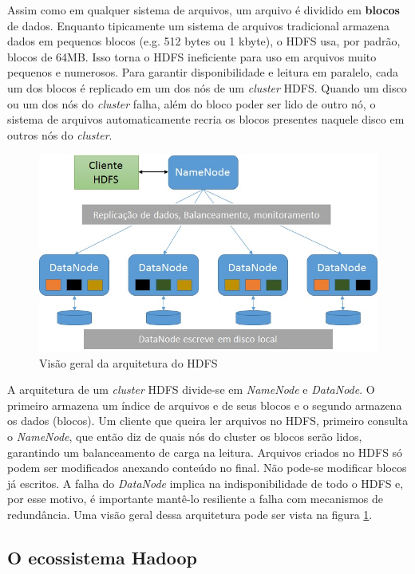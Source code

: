 Assim como em qualquer sistema de arquivos, um arquivo é dividido em \textbf{blocos} de dados. Enquanto 
tipicamente um sistema de arquivos tradicional armazena dados em pequenos blocos (e.g. 512 bytes ou 1 kbyte), 
o HDFS usa, por padrão, blocos de 64MB. Isso torna o HDFS ineficiente para uso em arquivos muito pequenos 
e numerosos. Para garantir disponibilidade e leitura em paralelo, cada um dos blocos é replicado em um dos 
nós de um \textit{cluster} HDFS. Quando um disco ou um dos nós do \textit{cluster} falha, além do bloco 
poder ser lido de outro nó, o sistema de arquivos automaticamente recria os blocos presentes naquele disco 
em outros nós do \textit{cluster}.

\begin{figure}
	\centering
	\includegraphics[width=\linewidth]{./Arquitetura_HDFS.jpg}
	\caption{Visão geral da arquitetura do HDFS}
	\label{fig:hdfs_arch}
\end{figure}

A arquitetura de um \textit{cluster} HDFS divide-se em \textit{NameNode} e \textit{DataNode}. O primeiro armazena um índice de arquivos e de seus blocos e o segundo armazena os dados (blocos). Um cliente que queira ler arquivos no HDFS, primeiro consulta o \textit{NameNode}, que então diz de quais nós do cluster os blocos serão lidos, garantindo um balanceamento de carga na leitura. Arquivos criados no HDFS só podem ser modificados anexando conteúdo no final. Não pode-se modificar blocos já escritos. A falha do \textit{DataNode} implica na indisponibilidade de todo o HDFS e, por esse motivo, é importante mantê-lo resiliente a falha com mecanismos de redundância. Uma visão geral dessa arquitetura pode ser vista na figura \ref{fig:hdfs_arch}.

\subsection{O ecossistema Hadoop}

